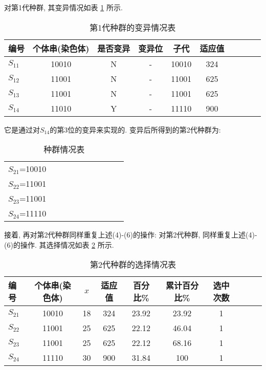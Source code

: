 对第1代种群, 其变异情况如表 \ref{AI_table2019112809} 所示.
\begin{table} [H]
\caption{第1代种群的变异情况表}
\vspace{-0.4cm}
\begin{center}
\begin{tabular} {lccccccccc}
  \hline
编号&	个体串(染色体)	&是否变异&	变异位	&子代&	适应值\\
  \hline
$S_{11}$&	10010&	N&	-	&10010&	324\\
$S_{12}$&	11001&	N&	-	&11001&	625\\
$S_{13}$&	11001&	N&  -	&11001&	625\\
$S_{14}$&	11010&	Y&  -	&11110&	900\\
\hline
\end{tabular}
\end{center}
\label{AI_table2019112809}
\vspace{-0.4cm}
\end{table}
它是通过对$S_{14}$的第3位的变异来实现的. 变异后所得到的第2代种群为:
\begin{table} [H]
\caption{种群情况表}
\vspace{-0.4cm}
\begin{center}
\begin{tabular} {lccccccccc}
\hline
$S_{21}$=10010\\
$S_{22}$=11001\\
$S_{23}$=11001\\
$S_{24}$=11110\\
\hline
\end{tabular}
\end{center}\vspace{-0.4cm}
\end{table}
接着, 再对第2代种群同样重复上述(4)-(6)的操作:
对第2代种群, 同样重复上述(4)-(6)的操作. 其选择情况如表 \ref{AI_table2019112810} 所示.
\begin{table} [H]
\caption{第2代种群的选择情况表}
\vspace{-0.4cm}
\begin{center}
\begin{tabular} {lccccccccc}
  \hline
编号	&个体串(染色体)&	$x$	&适应值	&百分比\%	&累计百分比\%	&选中次数\\
  \hline
$S_{21}$&	10010&	18	&324	&23.92	&23.92	&1\\
$S_{22}$&11001&	25	&625	&22.12	&46.04	&1\\
$S_{23}$	&11001&	25	&625	&22.12	&68.16	&1\\
$S_{24}$ &11110 &30	&900	&31.84&	100&1\\
\hline
\end{tabular}
\end{center}
\label{AI_table2019112810}
\vspace{-0.4cm}
\end{table}
